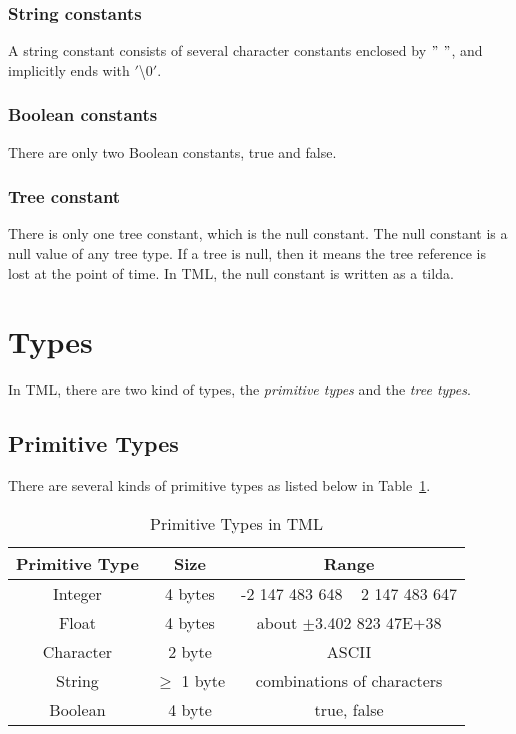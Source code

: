 \documentclass[12pt,psfig,a4]{article}
\begin{document}
\subsubsection {String constants}
A string constant consists of several character constants enclosed by $"$ $"$, and implicitly ends with $'$\textbackslash$0'$.

\subsubsection {Boolean constants}
There are only two Boolean constants, true and false.

\subsubsection {Tree constant}
There is only one tree constant, which is the null constant. The null constant is a null value of any tree type. If a tree is null, then it means the tree reference is lost at the point of time. In TML, the null constant is written as a tilda.


\section {Types}
In TML, there are two kind of types, the \textit{primitive types} and the \textit{tree types}.

\subsection {Primitive Types}
There are several kinds of primitive types as listed below in Table~\ref{pri_types}. 

\begin{table}[!ht]
\begin{center}
\begin{tabular}{| c | c | c |}
\hline
\textbf{Primitive Type} & \textbf{Size} & \textbf{Range} \\
\hline
Integer & 4 bytes & -2 147 483 648 ~  2 147 483 647 \\
\hline
Float & 4 bytes & about $\pm$3.402 823 47E+38\\
\hline
Character & 2 byte &  ASCII\\  %
\hline
String & $\geq$ 1 byte & combinations of characters \\
\hline
Boolean & 4 byte & true, false \\
\hline
\end{tabular}
\caption{Primitive Types in TML}
\label{pri_types}
\end {center}
\end{table}
\end{document}

